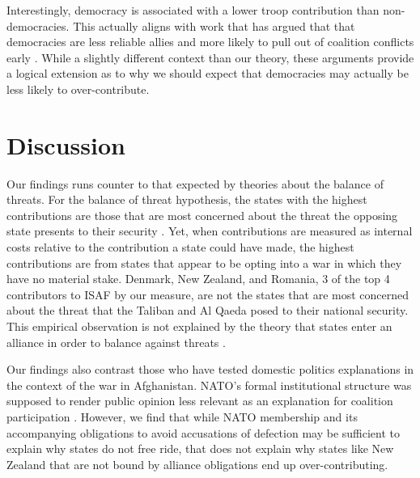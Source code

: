 \documentclass[12pt,letterpaper]{article}
\begin{document}
		Interestingly, democracy is associated with a lower troop contribution than non-democracies. This actually aligns with work that has argued that that democracies are less reliable allies and more likely to pull out of coalition conflicts early \citep{massie_whydemocraticallies_2016, gartzke_whydemocraciesmay_2004}. While a slightly different context than our theory, these arguments provide a logical extension as to why we should expect that democracies may actually be less likely to over-contribute.

\section{Discussion}
	Our findings runs counter to that expected by theories about the balance of threats. For the balance of threat hypothesis, the states with the highest contributions are those that are most concerned about the threat the opposing state presents to their security \citep{haesebrouck_democraticparticipationair_2016}. Yet, when contributions are measured as internal costs relative to the contribution a state could have made, the highest contributions are from states that appear to be opting into a war in which they have no material stake. Denmark, New Zealand, and Romania, 3 of the top 4 contributors to ISAF by our measure, are not the states that are most concerned about the threat that the Taliban and Al Qaeda posed to their national security. This empirical observation is not explained by the theory that states enter an alliance in order to balance against threats \citep{walt_originsalliance_1987}.

	Our findings also contrast those who have tested domestic politics explanations in the context of the war in Afghanistan. NATO's formal institutional structure was supposed to render public opinion less relevant as an explanation for coalition participation \citep{kreps_eliteconsensusdeterminant_2010}. However, we find that while NATO membership and its accompanying obligations to avoid accusations of defection may be sufficient to explain why states do not free ride, that does not explain why states like New Zealand that are not bound by alliance obligations end up over-contributing.
\end{document}
